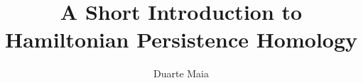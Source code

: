 \documentclass{article}
\title{A Short Introduction to Hamiltonian Persistence Homology}
\author{Duarte Maia}
\theoremstyle{nonumberplain}
\begin{document}
\maketitle

\pagebreak

\tableofcontents

\pagebreak











\end{document}
